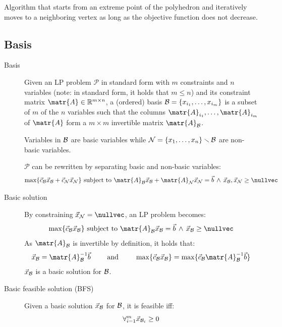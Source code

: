 Algorithm that starts from an extreme point of the polyhedron and iteratively moves to a neighboring vertex as long as the objective function does not decrease.


\subsection{Basis}

\begin{description}
    \item[Basis] 
        Given an LP problem $\mathcal{P}$ in standard form with $m$ constraints and $n$ variables (note: in standard form, it holds that $m \leq n$) and
        its constraint matrix $\matr{A} \in \mathbb{R}^{m \times n}$,
        a (ordered) basis $\mathcal{B} = \{ x_{i_1}, \dots, x_{i_m} \}$ is a subset of $m$ of the $n$ variables such that 
        the columns $\matr{A}_{i_1}, \dots, \matr{A}_{i_m}$ of $\matr{A}$ form a $m \times m$ invertible matrix $\matr{A}_\calB$.

        Variables in $\mathcal{B}$ are basic variables while 
        $\mathcal{N} = \{ x_1, \dots, x_n \} \smallsetminus \mathcal{B}$ are non-basic variables.

        $\mathcal{P}$ can be rewritten by separating basic and non-basic variables:
        \[ 
            \max \{ \vec{c}_\calB \vec{x}_\calB  + \vec{c}_\calN\vec{x}_\calN \} \text{ subject to } 
                \matr{A}_\calB \vec{x}_\calB + \matr{A}_\calN \vec{x}_\calN = \vec{b} \,\land\, \vec{x}_\calB, \vec{x}_\calN \geq \nullvec 
        \]

    \item[Basic solution] 
        By constraining $\vec{x}_\calN = \nullvec$, an LP problem becomes:
        \[ 
            \max \{ \vec{c}_\calB \vec{x}_\calB \} \text{ subject to } 
                \matr{A}_\calB \vec{x}_\calB = \vec{b} \,\land\, \vec{x}_\calB \geq \nullvec 
        \]
        As $\matr{A}_\calB$ is invertible by definition, it holds that:
        \[ 
            \vec{x}_\calB = \matr{A}_\calB^{-1} \vec{b} \hspace{2em}\text{ and }\hspace{2em} 
            \max \{ \vec{c}_\calB \vec{x}_\calB \} = \max \{ \vec{c}_\calB \matr{A}_\calB^{-1} \vec{b} \} 
        \]
        $\vec{x}_{\mathcal{B}}$ is a basic solution for $\mathcal{B}$.

    \item[Basic feasible solution (BFS)] 
        Given a basic solution $\vec{x}_{\mathcal{B}}$ for $\mathcal{B}$,
        it is feasible iff:
        \[ \forall_{i=1}^m \vec{x}_{\mathcal{B}_i} \geq 0 \]


\end{description}
